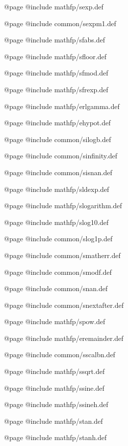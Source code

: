 @page
@include mathfp/sexp.def

@page
@include common/sexpm1.def

@page
@include mathfp/sfabs.def

@page
@include mathfp/sfloor.def

@page
@include mathfp/sfmod.def

@page
@include mathfp/sfrexp.def

@page
@include mathfp/erlgamma.def

@page
@include mathfp/ehypot.def

@page
@include common/silogb.def

@page
@include common/sinfinity.def

@page
@include common/sisnan.def

@page
@include mathfp/sldexp.def

@page
@include mathfp/slogarithm.def

@page
@include mathfp/slog10.def

@page
@include common/slog1p.def

@page
@include common/smatherr.def

@page
@include common/smodf.def

@page
@include common/snan.def

@page
@include common/snextafter.def

@page
@include mathfp/spow.def

@page
@include mathfp/eremainder.def

@page
@include common/sscalbn.def

@page
@include mathfp/ssqrt.def

@page
@include mathfp/ssine.def

@page
@include mathfp/ssineh.def

@page
@include mathfp/stan.def

@page
@include mathfp/stanh.def
